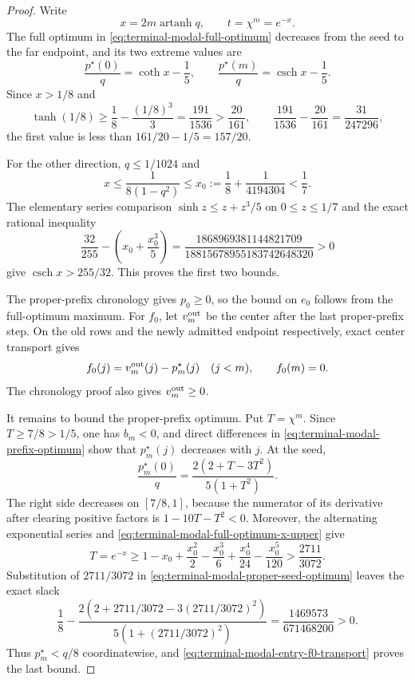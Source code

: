 \begin{proof}
Write
\[
 x=2m\operatorname{artanh}q,
 \qquad t=\chi^m=e^{-x}.
\]
The full optimum in \eqref{eq:terminal-modal-full-optimum} decreases from the
seed to the far endpoint, and its two extreme values are
\begin{equation}
 \frac{p^\star(0)}q=\coth x-\frac15,
 \qquad
 \frac{p^\star(m)}q=\operatorname{csch}x-\frac15.
 \label{eq:terminal-modal-full-optimum-extremes}
\end{equation}
Since $x>1/8$ and
\begin{equation}
 \tanh(1/8)\ge\frac18-\frac{(1/8)^3}{3}
 =\frac{191}{1536}>\frac{20}{161},
 \qquad
 \frac{191}{1536}-\frac{20}{161}=\frac{31}{247296},
 \label{eq:terminal-modal-full-optimum-sharpened-upper}
\end{equation}
the first value is less than $161/20-1/5=157/20$.

For the other direction, $q\le1/1024$ and
\begin{equation}
 x\le\frac1{8(1-q^2)}
 \le x_0:=\frac18+\frac1{4194304}<\frac17.
 \label{eq:terminal-modal-full-optimum-x-upper}
\end{equation}
The elementary series comparison
$\sinh z\le z+z^3/5$ on $0\le z\le1/7$ and the exact rational inequality
\[
 \frac{32}{255}-\left(x_0+\frac{x_0^3}{5}\right)
 =\frac{1868969381144821709}{18815678955183742648320}>0
\]
give $\operatorname{csch}x>255/32$.  This proves the first two bounds.

The proper-prefix chronology gives $p_0\ge0$, so the bound on $e_0$ follows
from the full-optimum maximum.  For $f_0$, let $v_m^{\rm out}$ be the center
after the last proper-prefix step.  On the old rows and the newly admitted
endpoint respectively, exact center transport gives
\begin{equation}
 f_0(j)=v_m^{\rm out}(j)-p_m^\star(j)\quad(j<m),
 \qquad f_0(m)=0.
 \label{eq:terminal-modal-entry-f0-transport}
\end{equation}
The chronology proof also gives $v_m^{\rm out}\ge0$.

It remains to bound the proper-prefix optimum.  Put $T=\chi^m$.  Since
$T\ge7/8>1/5$, one has $b_m<0$, and direct differences in
\eqref{eq:terminal-modal-prefix-optimum} show that $p_m^\star(j)$ decreases
with $j$.  At the seed,
\begin{equation}
 \frac{p_m^\star(0)}q
 =\frac{2(2+T-3T^2)}{5(1+T^2)}.
 \label{eq:terminal-modal-proper-seed-optimum}
\end{equation}
The right side decreases on $[7/8,1]$, because the numerator of its
derivative after clearing positive factors is $1-10T-T^2<0$.
Moreover, the alternating exponential series and
\eqref{eq:terminal-modal-full-optimum-x-upper} give
\[
 T=e^{-x}
 \ge1-x_0+\frac{x_0^2}{2}-\frac{x_0^3}{6}
       +\frac{x_0^4}{24}-\frac{x_0^5}{120}
 >\frac{2711}{3072}.
\]
Substitution of $2711/3072$ in
\eqref{eq:terminal-modal-proper-seed-optimum} leaves the exact slack
\[
 \frac18-
 \frac{2(2+2711/3072-3(2711/3072)^2)}
      {5(1+(2711/3072)^2)}
 =\frac{1469573}{671468200}>0.
\]
Thus $p_m^\star<q/8$ coordinatewise, and
\eqref{eq:terminal-modal-entry-f0-transport} proves the last bound.
\end{proof}

